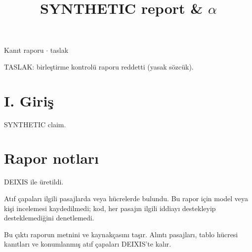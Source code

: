 \documentclass[journal]{IEEEtran}
\begin{document}
\renewcommand{\abstractname}{Özet}
\renewcommand{\IEEEkeywordsname}{Dizin Terimleri}
\renewcommand{\refname}{Kaynaklar}

\title{SYNTHETIC report \& \ensuremath{\alpha}}

\maketitle

\noindent Kanıt raporu \ensuremath{\cdot} taslak

\noindent TASLAK: birleştirme kontrolü raporu reddetti (yasak sözcük).

\section*{I. Giriş}

SYNTHETIC claim. \cite{Synth26}

\section*{Rapor notları}

DEIXIS ile üretildi.

Atıf çapaları ilgili pasajlarda veya hücrelerde bulundu. Bu rapor için model veya kişi incelemesi kaydedilmedi; kod, her pasajın ilgili iddiayı destekleyip desteklemediğini denetlemedi.

Bu çıktı raporun metnini ve kaynakçasını taşır. Alıntı pasajları, tablo hücresi kanıtları ve konumlanmış atıf çapaları DEIXIS'te kalır.




\end{document}
